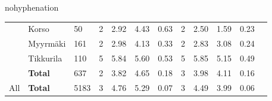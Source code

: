 \begin{hyphenrules}{nohyphenation}
\begin{table}[H]
{\begin{tabular}{clLcccCccccc}
            & Korso &                                   50 & 2 & 2.92 & 4.43 & 0.63 &    2 & 2.50 & 1.59 & 0.23 \\
            & Myyrmäki &                                161 & 2 & 2.98 & 4.13 & 0.33 &   2 & 2.83 & 3.08 & 0.24 \\
            & Tikkurila &                               110 & 5 & 5.84 & 5.60 & 0.53 &   5 & 5.85 & 5.15 & 0.49 \\
            \cmidrule(lr){2-11}
            & \textbf{Total} &                          637 & 2 & 3.82 & 4.65 & 0.18 &   3 & 3.98 & 4.11 & 0.16 \\
            \midrule
            All & \textbf{Total} &                      5183 & 3 & 4.76 & 5.29 & 0.07 &  3 & 4.49 & 3.99 & 0.06 \\
            \bottomrule
        \end{tabular}}
    \end{table}
\end{hyphenrules}

